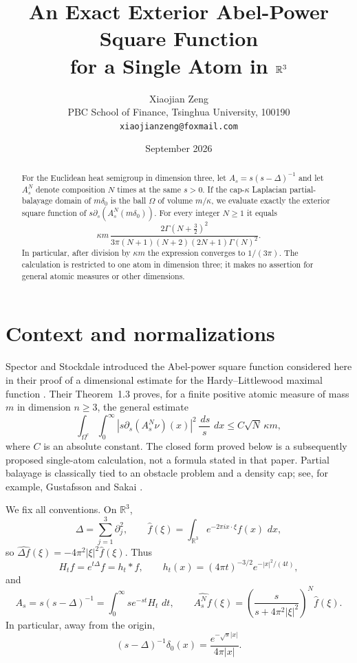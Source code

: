\documentclass[11pt]{article}
\title{An Exact Exterior Abel-Power Square Function\\
for a Single Atom in $\R^3$}
\author{Xiaojian Zeng\\
PBC School of Finance, Tsinghua University, 100190\\
\texttt{xiaojianzeng@foxmail.com}}
\date{September 2026}
\newcommand{\R}{\mathbb R}
\newcommand{\dd}{\,d}
\begin{document}
\maketitle

\begin{abstract}
For the Euclidean heat semigroup in dimension three, let
$A_s=s(s-\Delta)^{-1}$ and let $A_s^N$ denote composition $N$ times at the
same $s>0$.  If the cap-$\kappa$ Laplacian partial-balayage domain of
$m\delta_0$ is the ball $\Omega$ of volume $m/\kappa$, we evaluate exactly
the exterior square function of $s\partial_s(A_s^N(m\delta_0))$.  For every
integer $N\geq1$ it equals
\[
 \kappa m\,
 \frac{2\Gamma(N+\tfrac32)^2}
 {3\pi(N+1)(N+2)(2N+1)\Gamma(N)^2}.
\]
In particular, after division by $\kappa m$ the expression converges to
$1/(3\pi)$.  The calculation is restricted to one atom in dimension three;
it makes no assertion for general atomic measures or other dimensions.
\end{abstract}

\section{Context and normalizations}

Spector and Stockdale introduced the Abel-power square function considered
here in their proof of a dimensional estimate for the Hardy--Littlewood
maximal function \cite[eqs.~(1.10)--(1.11)]{SpectorStockdale}.  Their
Theorem~1.3 proves, for a finite positive atomic measure of mass $m$ in
dimension $n\geq3$, the general estimate
\[
 \int_{\Omega^c}\int_0^\infty
 |s\partial_s(A_s^N\nu)(x)|^2\,\frac{\dd s}{s}\,\dd x
 \leq C\sqrt N\,\kappa m,
\]
where $C$ is an absolute constant.
The closed form proved below is a subsequently proposed single-atom
calculation, not a formula stated in that paper.  Partial balayage is
classically tied to an obstacle problem and a density cap; see, for example,
Gustafsson and Sakai \cite{GustafssonSakai}.

We fix all conventions.  On $\R^3$,
\[
 \Delta=\sum_{j=1}^3\partial_j^2,
 \qquad
 \widehat f(\xi)=\int_{\R^3}e^{-2\pi i x\cdot\xi}f(x)\,\dd x,
\]
so $\widehat{\Delta f}(\xi)=-4\pi^2|\xi|^2\widehat f(\xi)$.  Thus
\[
 H_tf=e^{t\Delta}f=h_t*f,
 \qquad h_t(x)=(4\pi t)^{-3/2}e^{-|x|^2/(4t)},
\]
and
\[
 A_s=s(s-\Delta)^{-1}=\int_0^\infty se^{-st}H_t\,\dd t,
 \qquad
 \widehat{A_s^Nf}(\xi)=
 \left(\frac{s}{s+4\pi^2|\xi|^2}\right)^N\widehat f(\xi).
\]
In particular, away from the origin,
\[
 (s-\Delta)^{-1}\delta_0(x)=\frac{e^{-\sqrt{s}|x|}}{4\pi|x|}.
\]
\end{document}
